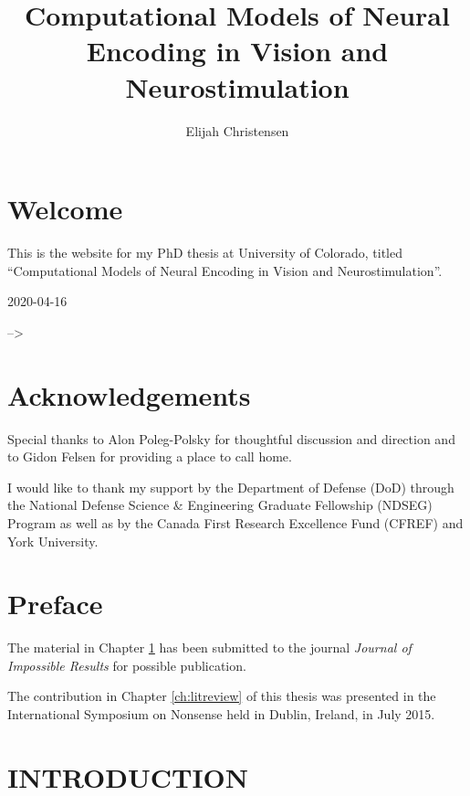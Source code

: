 \documentclass{templates/ucdenverthesis}
\author{Elijah Christensen}
\title{Computational Models of Neural Encoding in Vision and Neurostimulation}
\begin{document}

\titlepage

{\sf\tighttoc\doublespacing}

\hypertarget{welcome}{%
\chapter*{Welcome}\label{welcome}}

This is the website for my PhD thesis at University of Colorado, titled ``Computational Models of Neural Encoding in Vision and Neurostimulation''.

2020-04-16

--\textgreater{}

\hypertarget{acknowledgements}{%
\chapter*{Acknowledgements}\label{acknowledgements}}

Special thanks to Alon Poleg-Polsky for thoughtful discussion and direction and to Gidon Felsen for providing a place to call home.

I would like to thank my support by the Department of Defense (DoD) through the National Defense Science \& Engineering Graduate Fellowship (NDSEG) Program as well as by the Canada First Research Excellence Fund (CFREF) and York University.

\hypertarget{preface}{%
\chapter*{Preface}\label{preface}}

The material in Chapter \ref{ch:intro} has been submitted to the journal \emph{Journal of Impossible Results} for possible publication.

The contribution in Chapter \ref{ch:litreview} of this thesis was presented in the International Symposium on Nonsense held in Dublin, Ireland, in July 2015.

\clearpage{}\setcounter{page}{0}

\hypertarget{ch:intro}{%
\chapter{INTRODUCTION}\label{ch:intro}}
\end{document}
